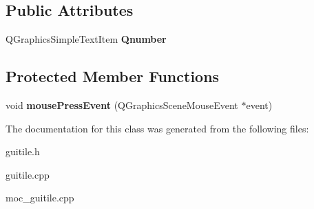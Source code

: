 \subsection*{\-Public \-Attributes}
\begin{DoxyCompactItemize}
\item 
\hypertarget{classGUITile_adb41b8360befbd6f7b643aa95f837513}{\-Q\-Graphics\-Simple\-Text\-Item {\bfseries \-Qnumber}}\label{classGUITile_adb41b8360befbd6f7b643aa95f837513}

\end{DoxyCompactItemize}
\subsection*{\-Protected \-Member \-Functions}
\begin{DoxyCompactItemize}
\item 
\hypertarget{classGUITile_a3cbb3943cd6c0c4b42261546d19e20f5}{void {\bfseries mouse\-Press\-Event} (\-Q\-Graphics\-Scene\-Mouse\-Event $\ast$event)}\label{classGUITile_a3cbb3943cd6c0c4b42261546d19e20f5}

\end{DoxyCompactItemize}


\-The documentation for this class was generated from the following files\-:\begin{DoxyCompactItemize}
\item 
guitile.\-h\item 
guitile.\-cpp\item 
moc\-\_\-guitile.\-cpp\end{DoxyCompactItemize}
